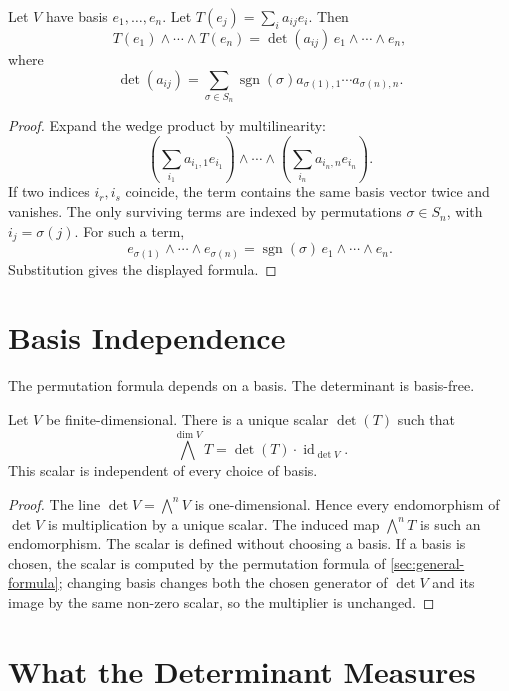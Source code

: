 \documentclass[11pt]{memoir}
\providecommand{\id}{\operatorname{id}}
\providecommand{\Cref}[1]{\ref{#1}}
\begin{document}
\begin{proposition}
\label{prop:permutation-formula}
Let \(V\) have basis \(e_1,\dots,e_n\). Let \(T(e_j)=\sum_i a_{ij}e_i\).
Then
\[
  T(e_1)\wedge\cdots\wedge T(e_n)
  =
  \det(a_{ij})\,e_1\wedge\cdots\wedge e_n,
\]
where
\[
  \det(a_{ij})
  =
  \sum_{\sigma\in S_n}\operatorname{sgn}(\sigma)
  a_{\sigma(1),1}\cdots a_{\sigma(n),n}.
\]
\end{proposition}

\begin{proof}
Expand the wedge product by multilinearity:
\[
  \left(\sum_{i_1}a_{i_1,1}e_{i_1}\right)\wedge\cdots\wedge
  \left(\sum_{i_n}a_{i_n,n}e_{i_n}\right).
\]
If two indices \(i_r,i_s\) coincide, the term contains the same basis
vector twice and vanishes. The only surviving terms are indexed by
permutations \(\sigma\in S_n\), with \(i_j=\sigma(j)\). For such a
term,
\[
  e_{\sigma(1)}\wedge\cdots\wedge e_{\sigma(n)}
  =
  \operatorname{sgn}(\sigma)\,e_1\wedge\cdots\wedge e_n.
\]
Substitution gives the displayed formula.
\end{proof}

\section{Basis Independence}
\label{sec:basis-independence}

The permutation formula depends on a basis. The determinant is
basis-free.

\begin{proposition}
\label{prop:basis-free-det}
Let \(V\) be finite-dimensional. There is a unique scalar \(\det(T)\)
such that
\[
  \bigwedge^{\dim V}T=\det(T)\cdot\id_{\det V}.
\]
This scalar is independent of every choice of basis.
\end{proposition}

\begin{proof}
The line \(\det V=\bigwedge^{n}V\) is one-dimensional. Hence every
endomorphism of \(\det V\) is multiplication by a unique scalar.
The induced map \(\bigwedge^n T\) is such an endomorphism. The scalar
is defined without choosing a basis. If a basis is chosen, the scalar
is computed by the permutation formula of
\Cref{sec:general-formula}; changing basis changes both the chosen
generator of \(\det V\) and its image by the same non-zero scalar, so
the multiplier is unchanged.
\end{proof}

\section{What the Determinant Measures}
\label{sec:what-det-measures}
\end{document}
